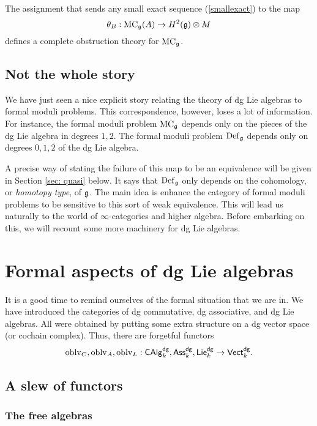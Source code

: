 \documentclass[11pt]{amsart}
\def\dgVect{{\sf Vect}^{\sf dg}}
\def\dgLie{{\sf Lie}^{\sf dg}}
\def\dgAss{{\sf Ass}^{\sf dg}}
\def\dgCAlg{{\sf CAlg}^{\sf dg}}
\begin{document}
\begin{prop}
The assignment that sends any small exact sequence (\ref{smallexact}) to the map
\[
\theta_B : {\rm MC}_\mathfrak g(A) \to H^2(\mathfrak g) \otimes M
\]
defines a complete obstruction theory for ${\rm MC}_\mathfrak g$. 
\end{prop}

\subsection{Not the whole story}

We have just seen a nice explicit story relating the theory of dg Lie algebras to formal moduli problems. 
This correspondence, however, loses a lot of information.
For instance, the formal moduli problem ${\rm MC}_\mathfrak g$ depends only on the pieces of the dg Lie algebra in degrees $1, 2$.
The formal moduli problem ${\rm Def}_\mathfrak g$ depends only on degrees $0,1,2$ of the dg Lie algebra. 

A precise way of stating the failure of this map to be an equivalence will be given in Section \ref{sec: quasi} below.
It says that ${\rm Def}_\mathfrak g$ only depends on the cohomology, or {\em homotopy type}, of $\mathfrak g$.
The main idea is enhance the category of formal moduli problems to be sensitive to this sort of weak equivalence. 
This will lead us naturally to the world of $\infty$-categories and higher algebra. 
Before embarking on this, we will recount some more machinery for dg Lie algebras. 

\section{Formal aspects of dg Lie algebras}

\def\oblv{{\rm oblv}}

It is a good time to remind ourselves of the formal situation that we are in. 
We have introduced the categories of dg commutative, dg associative, and dg Lie algebras.
All were obtained by putting some extra structure on a dg vector space (or cochain complex).
Thus, there are forgetful functors
\[
\oblv_{C}, \oblv_{A}, \oblv_L : \dgCAlg_k, \dgAss_k, \dgLie_k \to \dgVect_k .
\] 

\subsection{A slew of functors}
\def\Tens{{\rm Tens}}

\subsubsection{The free algebras}
\end{document}
